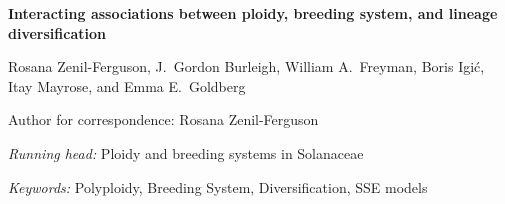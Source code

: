 \documentclass[11pt]{article}
\begin{document}

%
%
%
%
%
%

\begin{center}
    \textbf{Interacting associations between ploidy, breeding system, and lineage diversification}
\end{center}

\vfill

\noindent
Rosana Zenil-Ferguson,%
%
\noindent
J.~Gordon Burleigh,%
%
\noindent
William A.~Freyman,%
%
\noindent
Boris Igi\'c,%
%
\noindent
Itay Mayrose,%
%
and
Emma E.~Goldberg%

\vfill

\theendnotes

\noindent
Author for correspondence: Rosana Zenil-Ferguson

\vfill

\noindent
\textit{Running head:} Ploidy and breeding systems in Solanaceae

\vfill

\noindent
\textit{Keywords:} 
Polyploidy,
Breeding System,
Diversification, SSE models

\vfill

\linenumbers

\end{document}
